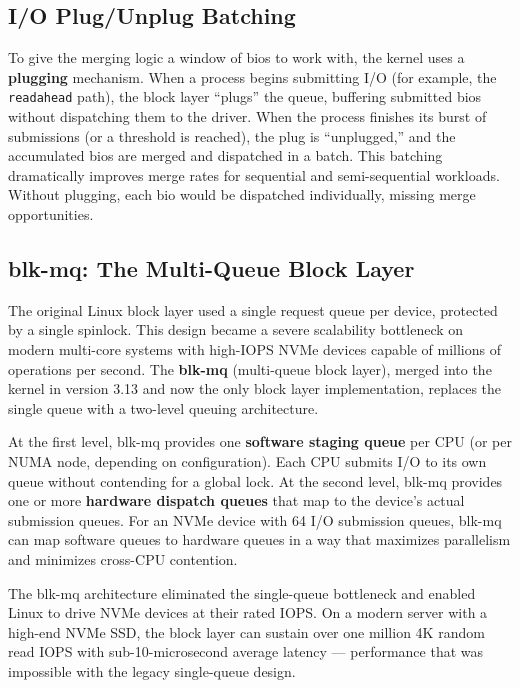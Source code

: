 \subsection{I/O Plug/Unplug Batching}

To give the merging logic a window of bios to work with, the kernel uses a \textbf{plugging} mechanism. When a process begins submitting I/O (for example, the \texttt{readahead} path), the block layer ``plugs'' the queue, buffering submitted bios without dispatching them to the driver. When the process finishes its burst of submissions (or a threshold is reached), the plug is ``unplugged,'' and the accumulated bios are merged and dispatched in a batch. This batching dramatically improves merge rates for sequential and semi-sequential workloads. Without plugging, each bio would be dispatched individually, missing merge opportunities.

\subsection{blk-mq: The Multi-Queue Block Layer}

The original Linux block layer used a single request queue per device, protected by a single spinlock. This design became a severe scalability bottleneck on modern multi-core systems with high-IOPS NVMe devices capable of millions of operations per second. The \textbf{blk-mq} (multi-queue block layer), merged into the kernel in version 3.13 and now the only block layer implementation, replaces the single queue with a two-level queuing architecture.

At the first level, blk-mq provides one \textbf{software staging queue} per CPU (or per NUMA node, depending on configuration). Each CPU submits I/O to its own queue without contending for a global lock. At the second level, blk-mq provides one or more \textbf{hardware dispatch queues} that map to the device's actual submission queues. For an NVMe device with 64 I/O submission queues, blk-mq can map software queues to hardware queues in a way that maximizes parallelism and minimizes cross-CPU contention.

The blk-mq architecture eliminated the single-queue bottleneck and enabled Linux to drive NVMe devices at their rated IOPS. On a modern server with a high-end NVMe SSD, the block layer can sustain over one million 4K random read IOPS with sub-10-microsecond average latency --- performance that was impossible with the legacy single-queue design.


